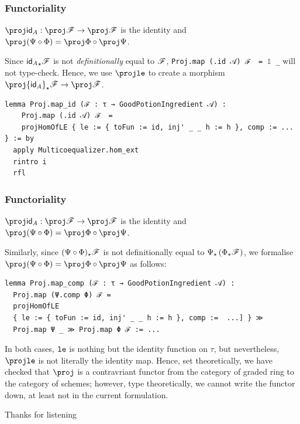 \documentclass[9pt]{beamer}
\begin{document}
\begin{frame}[fragile]
\frametitle{Functoriality}

\begin{corollary}
  $\proj\id_A: \proj \scrF \to \proj \scrF$ is the identity and $\proj(\Psi \circ \Phi) = \proj \Phi \circ \proj \Psi$.
\end{corollary}
Since ${\mathsf{id}_A}_{\star}\mathscr{F}$ is not \emph{definitionally} equal to $\mathscr{F}$, \lstinline|Proj.map (.id 𝒜) ℱ  = 𝟙 _| will not type-check.
Hence, we use $\proj\leanmath{le}$ to create a morphism $\proj {\id_A}_{\star}\scrF \to \proj \scrF$.
\begin{lstlisting}[caption={$\proj$ is a contravariant functor}]
lemma Proj.map_id (ℱ : τ → GoodPotionIngredient 𝒜) :
    Proj.map (.id 𝒜) ℱ  =
    projHomOfLE { le := { toFun := id, inj' _ _ h := h }, comp := ... } := by
  apply Multicoequalizer.hom_ext
  rintro i
  rfl
\end{lstlisting}
\end{frame}

\begin{frame}[fragile]
\frametitle{Functoriality}

\begin{corollary}
  $\proj\id_A: \proj \scrF \to \proj \scrF$ is the identity and $\proj(\Psi \circ \Phi) = \proj \Phi \circ \proj \Psi$.
\end{corollary}
Similarly, since $(\Psi \circ \Phi)_{\star}\mathscr{F}$ is not definitionally equal to $\Psi_{\star}\left( \Phi_{\star}\mathscr{F} \right)$, we formalise 
$\proj(\Psi \circ \Phi) = \proj \Phi \circ \proj \Psi$ as follows:
\begin{lstlisting}
lemma Proj.map_comp (ℱ : τ → GoodPotionIngredient 𝒜) :
  Proj.map (Ψ.comp Φ) ℱ =
  projHomOfLE
  { le := { toFun := id, inj' _ _ h := h }, comp :=  ...] } ≫ 
  Proj.map Ψ _ ≫ Proj.map Φ ℱ := ...
\end{lstlisting}
In both cases, ${\footnotesize{\mathtt{le}}}$ is nothing but the identity function on $\tau$, but nevertheless, 
$\proj\leanmath{le}$ is not literally the identity map. Hence, set theoretically, we have checked that $\proj$ is a contravriant functor
from the category of graded ring to the category of schemes; however, type theoretically, we cannot write the functor down, at least not in the current formulation.
\end{frame}

\begin{frame}
\begin{center}
Thanks for listening
\end{center}
\end{frame}
\end{document}
